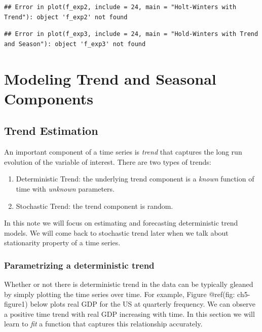 \documentclass[]{book}
\theoremstyle{definition}
\theoremstyle{definition}
\theoremstyle{definition}
\theoremstyle{remark}
\begin{document}
\begin{verbatim}
## Error in plot(f_exp2, include = 24, main = "Holt-Winters with Trend"): object 'f_exp2' not found
\end{verbatim}

\begin{verbatim}
## Error in plot(f_exp3, include = 24, main = "Hold-Winters with Trend and Season"): object 'f_exp3' not found
\end{verbatim}

\hypertarget{modeling-trend-and-seasonal-components}{%
\chapter{Modeling Trend and Seasonal
Components}\label{modeling-trend-and-seasonal-components}}

\hypertarget{trend-estimation}{%
\section{Trend Estimation}\label{trend-estimation}}

An important component of a time series is \emph{trend} that captures
the long run evolution of the variable of interest. There are two types
of trends:

\begin{enumerate}
\def\labelenumi{\arabic{enumi}.}
\item
  Deterministic Trend: the underlying trend component is a \emph{known}
  function of time with \emph{unknown} parameters.
\item
  Stochastic Trend: the trend component is random.
\end{enumerate}

In this note we will focus on estimating and forecasting deterministic
trend models. We will come back to stochastic trend later when we talk
about stationarity property of a time series.

\hypertarget{parametrizing-a-deterministic-trend}{%
\subsection{Parametrizing a deterministic
trend}\label{parametrizing-a-deterministic-trend}}

Whether or not there is deterministic trend in the data can be typically
gleaned by simply plotting the time series over time. For example,
Figure @ref(fig: ch5-figure1) below plots real GDP for the US at
quarterly frequency. We can observe a positive time trend with real GDP
increasing with time. In this section we will learn to \emph{fit} a
function that captures this relationship accurately.
\end{document}
